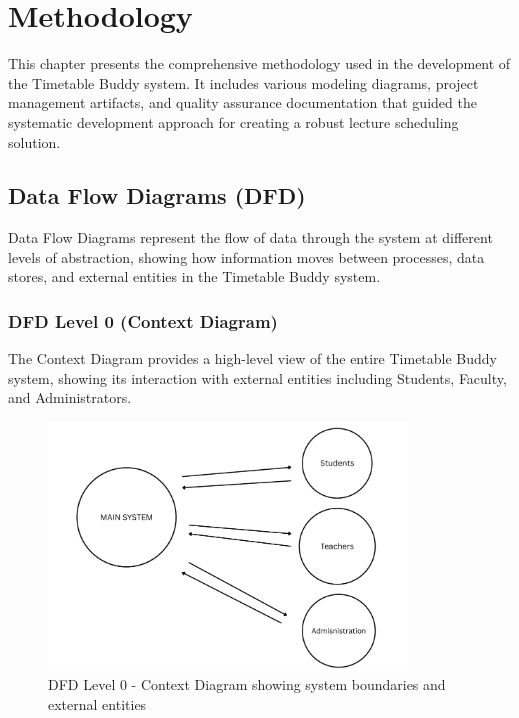 \chapter{Methodology}

This chapter presents the comprehensive methodology used in the development of the Timetable Buddy system. It includes various modeling diagrams, project management artifacts, and quality assurance documentation that guided the systematic development approach for creating a robust lecture scheduling solution.

\section{Data Flow Diagrams (DFD)}

Data Flow Diagrams represent the flow of data through the system at different levels of abstraction, showing how information moves between processes, data stores, and external entities in the Timetable Buddy system.

\subsection{DFD Level 0 (Context Diagram)}

The Context Diagram provides a high-level view of the entire Timetable Buddy system, showing its interaction with external entities including Students, Faculty, and Administrators.

\begin{figure}[htbp]
    \centering
    \includegraphics[width=0.85\textwidth]{images/DFD Level 0.png}
    \caption{DFD Level 0 - Context Diagram showing system boundaries and external entities}
    \label{fig:dfd0}
\end{figure}

